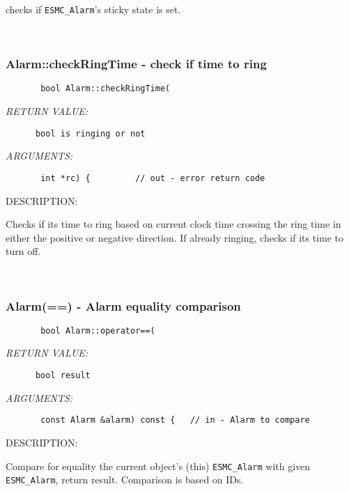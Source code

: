       checks if {\tt ESMC\_Alarm}'s sticky state is set.
   
 
\mbox{}\hrulefill\ 
 
\subsubsection [Alarm::checkRingTime] {Alarm::checkRingTime - check if time to ring}


  
\begin{verbatim}       bool Alarm::checkRingTime(\end{verbatim}{\em RETURN VALUE:}
\begin{verbatim}      bool is ringing or not\end{verbatim}{\em ARGUMENTS:}
\begin{verbatim}       int *rc) {         // out - error return code
 \end{verbatim}
{\sf DESCRIPTION:\\ }


      Checks if its time to ring based on current clock time crossing the ring
      time in either the positive or negative direction. If already ringing,
      checks if its time to turn off.
   
 
\mbox{}\hrulefill\ 
 
\subsubsection [Alarm(==)] {Alarm(==) - Alarm equality comparison }


  
\begin{verbatim}       bool Alarm::operator==(\end{verbatim}{\em RETURN VALUE:}
\begin{verbatim}      bool result\end{verbatim}{\em ARGUMENTS:}
\begin{verbatim}       const Alarm &alarm) const {   // in - Alarm to compare\end{verbatim}
{\sf DESCRIPTION:\\ }


        Compare for equality the current object's (this) {\tt ESMC\_Alarm} with
        given {\tt ESMC\_Alarm}, return result.  Comparison is based on IDs.
   
